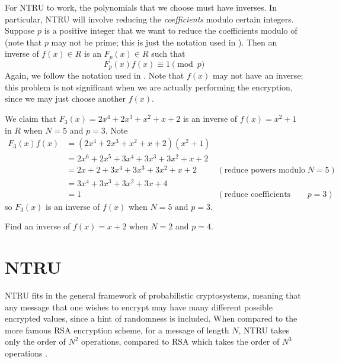 For NTRU to work, the polynomials that we choose must have inverses. In particular, NTRU will involve reducing the \textit{coefficients} modulo certain integers. Suppose $p$ is a positive integer that we want to reduce the coefficients modulo of (note that $p$ may not be prime; this is just the notation used in \cite[\S~1.1]{hoffstein_pipher_silverman_1998}). Then an inverse of $f(x) \in R$ is an $F_p(x) \in R$ such that
\[
    F_p(x)f(x) \equiv 1 \pmod p
\]
Again, we follow the notation used in \cite{hoffstein_pipher_silverman_1998}. Note that $f(x)$ may not have an inverse; this problem is not significant when we are actually performing the encryption, since we may just choose another $f(x)$.

\begin{example}
    We claim that $F_3(x) = 2x^4 + 2x^3 + x^2 + x + 2$ is an inverse of $f(x) = x^2 + 1$ in $R$ when $N = 5$ and $p = 3$. Note
    \begin{align*}
        F_3(x)f(x) &= (2x^4 + 2x^3 + x^2 + x + 2)(x^2+1)\\
        &= 2x^6 + 2x^5 + 3x^4 + 3x^3 + 3x^2 + x + 2\\
        &= 2x + 2 + 3x^4 + 3x^3 + 3x^2 + x + 2 & (\text{reduce powers modulo }N = 5)\\
        &= 3x^4 + 3x^3 + 3x^2 + 3x + 4\\
        &= 1 & (\text{reduce coefficients modulo } p = 3)
    \end{align*}
    so $F_3(x)$ is an inverse of $f(x)$ when $N = 5$ and $p = 3$.
\end{example}

\begin{exercise}
    Find an inverse of $f(x) = x + 2$ when $N = 2$ and $p = 4$.
\end{exercise}

\section{NTRU}
NTRU fits in the general framework of probabilistic cryptosystems, meaning that any message that one wishes to encrypt may have many different possible encrypted values, since a hint of randomness is included. When compared to the more famous RSA encryption scheme, for a message of length $N$, NTRU takes only the order of $N^2$ operations, compared to RSA which takes the order of $N^3$ operations \cite[p.~268]{hoffstein_pipher_silverman_1998}.

